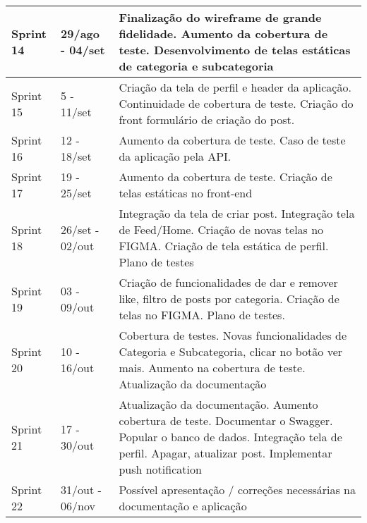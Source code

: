 \begin{quadro}[htb]
\begin{tabular}{|p{1.5cm}|p{3.0cm}|p{10.0cm}|}
		\hline
		Sprint 14 & 29/ago - 04/set  & Finalização do wireframe de grande fidelidade. Aumento da cobertura de teste. Desenvolvimento de telas estáticas de categoria e subcategoria \\
		\hline
		Sprint 15 & 5 - 11/set & Criação da tela de perfil e header da aplicação. Continuidade de cobertura de teste. Criação do front formulário  de criação do post. \\
		\hline
		Sprint 16 & 12 - 18/set & Aumento da cobertura de teste. Caso de teste da aplicação pela API.  \\
		\hline
		Sprint 17 & 19 - 25/set & Aumento da cobertura de teste. Criação de telas estáticas no front-end \\
		\hline
		Sprint 18 & 26/set - 02/out & Integração da tela de criar post. Integração tela de Feed/Home. Criação de novas telas no FIGMA. Criação de tela estática de perfil. Plano de testes   \\
		\hline
		Sprint 19 & 03 - 09/out  & Criação de funcionalidades de dar  e remover like, filtro de posts por categoria. Criação de telas no FIGMA. Plano de testes.  \\
		\hline
		Sprint 20 & 10 - 16/out  & Cobertura de testes. Novas funcionalidades de Categoria e Subcategoria, clicar no botão ver mais. Aumento na cobertura de teste. Atualização da documentação  \\
		\hline
		Sprint 21 & 17 - 30/out & Atualização da documentação. Aumento cobertura de teste. Documentar o Swagger. Popular o banco de dados. Integração tela de perfil. Apagar, atualizar post. Implementar push notification \\
		\hline
		Sprint 22 & 31/out - 06/nov & Possível apresentação / correções necessárias na documentação e aplicação \\
		\hline
	\end{tabular}
\end{quadro}